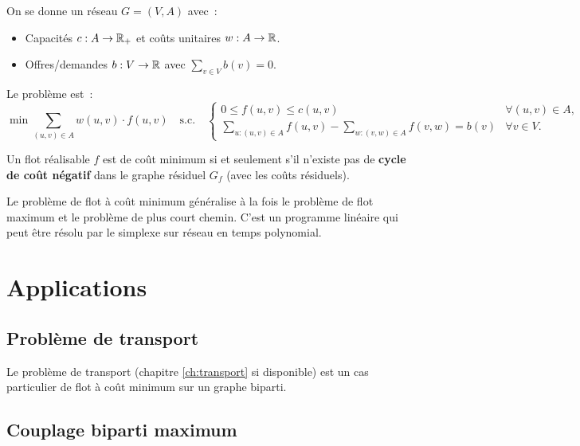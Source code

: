 \begin{definition}
On se donne un r\'eseau $G = (V, A)$ avec~:
\begin{itemize}
  \item Capacit\'es $c : A \to \mathbb{R}_+$ et co\^uts unitaires $w : A \to \mathbb{R}$.
  \item Offres/demandes $b : V \to \mathbb{R}$ avec $\sum_{v \in V} b(v) = 0$.
\end{itemize}
Le probl\`eme est~:
\[
  \min \sum_{(u,v) \in A} w(u,v) \cdot f(u,v) \quad \text{s.c.} \quad
  \begin{cases}
    0 \leq f(u,v) \leq c(u,v) & \forall (u,v) \in A, \\
    \displaystyle\sum_{u:(u,v)\in A} f(u,v) - \sum_{w:(v,w)\in A} f(v,w) = b(v)
    & \forall v \in V.
  \end{cases}
\]
\end{definition}

\begin{theoreme}
Un flot r\'ealisable $f$ est de co\^ut minimum si et seulement s'il n'existe pas
de \textbf{cycle de co\^ut n\'egatif} dans le graphe r\'esiduel $G_f$ (avec les
co\^uts r\'esiduels).
\end{theoreme}

\begin{remarque}
Le probl\`eme de flot \`a co\^ut minimum g\'en\'eralise \`a la fois le probl\`eme
de flot maximum et le probl\`eme de plus court chemin. C'est un programme
lin\'eaire qui peut \^etre r\'esolu par le simplexe sur r\'eseau en temps
polynomial.
\end{remarque}

\section{Applications}

\subsection{Probl\`eme de transport}

Le probl\`eme de transport (chapitre \ref{ch:transport} si disponible) est un
cas particulier de flot \`a co\^ut minimum sur un graphe biparti.

\subsection{Couplage biparti maximum}

